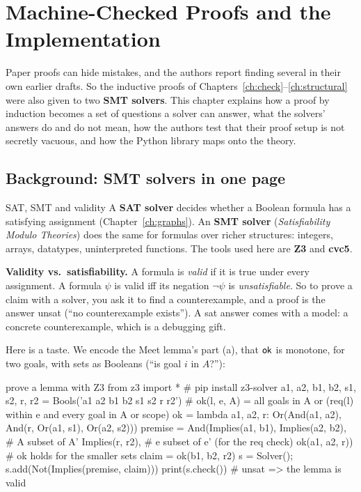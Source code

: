 \section{Machine-Checked Proofs and the Implementation}
\label{ch:proofs}

\begin{bigidea}
Paper proofs can hide mistakes, and the authors report finding several in their own earlier drafts. So the inductive proofs of Chapters~\ref{ch:check}--\ref{ch:structural} were also given to two \textbf{SMT solvers}. This chapter explains how a proof by induction becomes a set of questions a solver can answer, what the solvers' answers do and do not mean, how the authors test that their proof setup is not secretly vacuous, and how the Python library maps onto the theory.
\end{bigidea}

\subsection{Background: SMT solvers in one page}

\begin{toolbox}{SAT, SMT and validity}
A \textbf{SAT solver} decides whether a Boolean formula has a satisfying assignment (Chapter~\ref{ch:graphs}). An \textbf{SMT solver} (\emph{Satisfiability Modulo Theories}) does the same for formulas over richer structures: integers, arrays, datatypes, uninterpreted functions. The tools used here are \textbf{Z3} and \textbf{cvc5}.

\textbf{Validity vs.\ satisfiability.} A formula is \emph{valid} if it is true under every assignment. A formula $\psi$ is valid iff its negation $\neg\psi$ is \emph{unsatisfiable}. So to prove a claim with a solver, you ask it to find a counterexample, and a proof is the answer \textsf{unsat} (``no counterexample exists''). A \textsf{sat} answer comes with a model: a concrete counterexample, which is a debugging gift.
\end{toolbox}

Here is a taste. We encode the Meet lemma's part (a), that $\mathsf{ok}$ is monotone, for two goals, with sets as Booleans (``is goal $i$ in $A$?''):

\begin{tryit}{prove a lemma with Z3}
from z3 import *          # pip install z3-solver
a1, a2, b1, b2, s1, s2, r, r2 = Bools('a1 a2 b1 b2 s1 s2 r r2')
# ok(l, e, A) = all goals in A   or   (req(l) within e  and  every goal in A or scope)
ok = lambda a1, a2, r: Or(And(a1, a2), And(r, Or(a1, s1), Or(a2, s2)))
premise = And(Implies(a1, b1), Implies(a2, b2),   # A subset of A'
              Implies(r, r2),                      # e subset of e' (for the req check)
              ok(a1, a2, r))                       # ok holds for the smaller sets
claim = ok(b1, b2, r2)
s = Solver(); s.add(Not(Implies(premise, claim)))
print(s.check())          # unsat  => the lemma is valid
\end{tryit}


